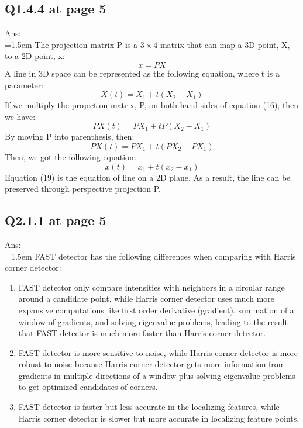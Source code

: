 \documentclass[12pt]{article}
\begin{document}
	\subsection*{Q1.4.4 at page 5}
	Ans:\\
	\hangindent=1.5em \hspace{1.5em} The projection matrix P is a $3\times4$ matrix that can map a 3D point, X, to a 2D point, x:
	\begin{equation}
		x = P X
	\end{equation}
	A line in 3D space can be represented as the following equation, where t is a parameter:
	\begin{equation}
		X(t) = X_1 + t(X_2-X_1) 
	\end{equation}
	If we multiply the projection matrix, P, on both hand sides of equation (16), then we have:
	\begin{equation}
		P X(t) = P X_1 + t P (X_2-X_1) 
	\end{equation}
	By moving P into parenthesis, then:
	\begin{equation}
		P X(t) = P X_1 + t (P X_2- P X_1) 
	\end{equation}	
	Then, we got the following equation:
	\begin{equation}
		x(t) = x_1 + t (x_2- x_1) 
	\end{equation}
	Equation (19) is the equation of line on a 2D plane. As a result, the line can be preserved through perspective projection P.	
	
	\newpage
	\subsection*{Q2.1.1 at page 5}
	Ans:\\
	\hangindent=1.5em \hspace{1.5em} FAST detector has the following differences when comparing with Harris corner detector:
	\begin{enumerate}
		\item FAST detector only compare intensities with neighbors in a circular range around a candidate point, while Harris corner detector uses much more expansive computations like first order derivative (gradient), summation of a window of gradients, and solving eigenvalue problems, leading to the result that FAST detector is much more faster than Harris corner detector.
		\item FAST detector is more sensitive to noise, while Harris corner detector is more robust to noise because Harris corner detector gets more information from gradients in multiple directions of a window plus solving eigenvalue problems to get optimized candidates of corners.
		\item FAST detector is faster but less accurate in the localizing features, while Harris corner detector is slower but more accurate in localizing feature points.
	\end{enumerate}
	
\end{document}
